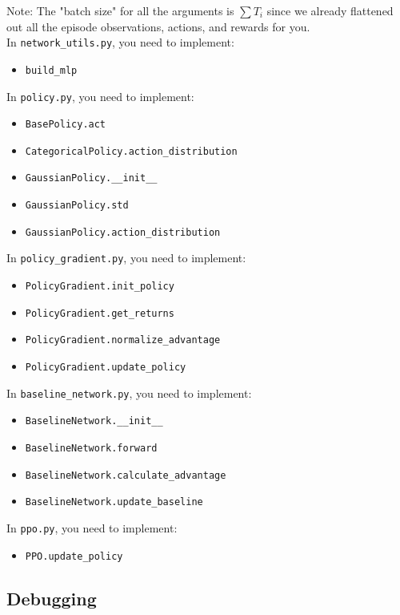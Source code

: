 \documentclass{article}
\begin{document}
Note: The "batch size" for all the arguments is $\sum T_i$ since we already flattened out all the episode observations, actions, and rewards for you.
\\
In \texttt{network\_utils.py}, you need to implement:
\begin{itemize}
\item \texttt{build\_mlp}
\end{itemize}

In \texttt{policy.py}, you need to implement:
\begin{itemize}
\item \texttt{BasePolicy.act}
\item \texttt{CategoricalPolicy.action\_distribution}
\item \texttt{GaussianPolicy.\_\_init\_\_}
\item \texttt{GaussianPolicy.std}
\item \texttt{GaussianPolicy.action\_distribution}
\end{itemize}

In \texttt{policy\_gradient.py}, you need to implement:
\begin{itemize}
\item \texttt{PolicyGradient.init\_policy}
\item \texttt{PolicyGradient.get\_returns}
\item \texttt{PolicyGradient.normalize\_advantage}
\item \texttt{PolicyGradient.update\_policy}
\end{itemize}

In \texttt{baseline\_network.py}, you need to implement:
\begin{itemize}
\item \texttt{BaselineNetwork.\_\_init\_\_}
\item \texttt{BaselineNetwork.forward}
\item \texttt{BaselineNetwork.calculate\_advantage}
\item \texttt{BaselineNetwork.update\_baseline}
\end{itemize}

In \texttt{ppo.py}, you need to implement:
\begin{itemize}
\item \texttt{PPO.update\_policy}
\end{itemize}

\subsection{Debugging}
\end{document}
